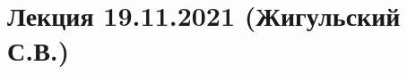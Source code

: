 \documentclass[main.tex]{subfiles}
\begin{document}
\section{Лекция 19.11.2021 (Жигульский С.В.)}
\end{document}

